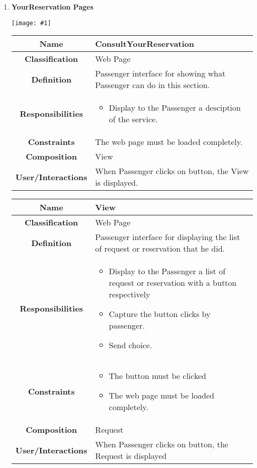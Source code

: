 \documentclass[11pt, a4paper,titlepage]{article}
\newcommand{\image}[1]{
	\begin{center}
		\noindent \texttt{[image: \#1]}
	\end{center}
	}
\begin{document}
\begin{enumerate}
\newpage
\item \textbf{YourReservation Pages}\\
\image{page_yourreservation.png}
\begin{tabularx}{\textwidth}{| c | X |}
	\hline
	\textbf{Name} & 
	ConsultYourReservation
	\\
	\hline
	\textbf{Classification} & 
	Web Page
	\\
	\hline
	\textbf{Definition} & 
	Passenger interface for showing what Passenger can do in this section.\\
	\hline
	\textbf{Responsibilities} &
	\begin{itemize}
		\item Display to the Passenger a desciption of the service.
	\end{itemize}
	\\
	\hline
	\textbf{Constraints} & The web page must be loaded completely.
	\\
	\hline
	\textbf{Composition} & 
	View
	\\
	\hline
	\textbf{User/Interactions} & 
	When Passenger clicks on button, the View is displayed.
	\\
	\hline	
\end{tabularx}

\begin{tabularx}{\textwidth}{| c | X |}
	\hline
	\textbf{Name} & 
	View
	\\
	\hline
	\textbf{Classification} & 
	Web Page
	\\
	\hline
	\textbf{Definition} & 
	Passenger interface for displaying the list of request or reservation that he did.
	\\
	\hline
	\textbf{Responsibilities} &
		\begin{itemize}
			\item Display to the Passenger a list of request or reservation with a button respectively
			\item Capture the button clicks by passenger.    
			\item Send choice.
		\end{itemize}
	\\
	\hline
	\textbf{Constraints} & 
		\begin{itemize}
			\item The button must be clicked
			\item The web page must be loaded completely.
		\end{itemize}
	\\
	\hline
	\textbf{Composition} & 
	Request
	\\
	\hline
	\textbf{User/Interactions} & 
	When Passenger clicks on button, the Request is displayed
	\\
	\hline	
\end{tabularx}


\end{enumerate}
\end{document}

